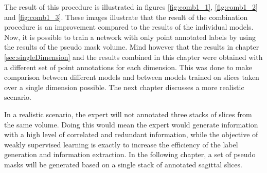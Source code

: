 \par{
    The result of this procedure is illustrated in figures \ref{fig:comb1_1}, \ref{fig:comb1_2} and \ref{fig:comb1_3}.
    These images illustrate that the result of the combination procedure is an improvement compared to the results of the individual models.
    Now, it is possible to train a network with only point annotated labels by using the results of the pseudo mask volume.
    Mind however that the results in chapter \ref{sec:singleDimension} and the results combined in this chapter were obtained with a different set of point annotations for each dimension.
    This was done to make comparison between different models and between models trained on slices taken over a single dimension possible. The next chapter discusses a more realistic scenario.
}
\par{
    In a realistic scenario, the expert will not annotated three stacks of slices from the same volume.
    Doing this would mean the expert would generate information with a high level of correlated and redundant information, 
    while the objective of weakly supervised learning is exactly to increase the efficiency of the label generation and information extraction.
    In the following chapter, a set of pseudo masks will be generated based on a single stack of annotated sagittal slices.
}
